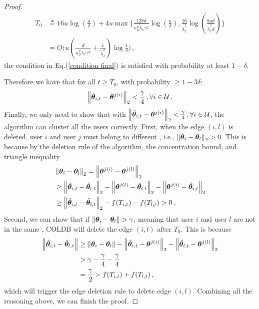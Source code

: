\begin{proof}
\begin{equation*}
    \begin{aligned}
        T_0&\triangleq 16u\log(\frac{u}{\delta})+4u\max\{
        \frac{128d}{\kappa_\mu^2\tilde{\lambda}_x\gamma^2}\log(\frac{u}{\delta}),\frac{16}{\tilde{\lambda}_x^2}\log(\frac{8ud}{\tilde{\lambda}_x^2\delta})\}\\
        &=O\bigg(u\left( \frac{d}{\kappa_\mu^2\tilde{\lambda}_x\gamma^2}+\frac{1}{\tilde{\lambda}_x^2}\right)\log \frac{1}{\delta}\bigg)\,,
    \end{aligned}
\end{equation*}
the condition in Eq.(\ref{condition final}) is satisfied with probability at least $1-\delta$.

Therefore we have that for all $t\geq T_0$, with probability $\geq 1-3\delta$:
\begin{equation}
    \left\| \hat{\boldsymbol{\theta}}_{i,t}-\boldsymbol{\theta}^{j(i)} \right\|_2<\frac{\gamma}{4}\,,\forall{i\in\mathcal{U}}\,.
    \label{final condition}
\end{equation}
Finally, we only need to show that with $\left\| \hat{\boldsymbol{\theta}}_{i,t}-\boldsymbol{\theta}^{j(i)} \right\|_2<\frac{\gamma}{4}\,,\forall{i\in\mathcal{U}}$, the algorithm can cluster all the users correctly. First, when the edge $(i,l)$ is deleted, user $i$ and user $j$ must belong to different \gtclusters{}, i.e., $\left\| \boldsymbol{\theta}_i-\boldsymbol{\theta}_l \right\|_2>0$. This is because by the deletion rule of the algorithm, the concentration bound, and triangle inequality
\begin{align}
   &\left\| \boldsymbol{\theta}_i-\boldsymbol{\theta}_l \right\|_2=\left\| \boldsymbol{\theta}^{j(i)}-\boldsymbol{\theta}^{j(l)} \right\|_2\notag\\
   &\geq\left\| \hat{\boldsymbol{\theta}}_{i,t}-\hat{\boldsymbol{\theta}}_{l,t} \right\|_2-\left\| \boldsymbol{\theta}^{j(l)}-\hat{\boldsymbol{\theta}}_{l,t} \right\|_2-\left\| \boldsymbol{\theta}^{j(i)}-\hat{\boldsymbol{\theta}}_{i,t} \right\|_2\notag\\
   &\geq\left\| \hat{\boldsymbol{\theta}}_{i,t}-\hat{\boldsymbol{\theta}}_{l,t} \right\|_2-f(T_{i,t})-f(T_{l,t})>0 \,.
\end{align}
Second, we can show that if $\norm{\btheta_i-\btheta_l}>\gamma$, meaning that user $i$ and user $l$ are not in the same \gtcluster, COLDB will delete the edge $(i,l)$ after $T_0$. This is because
\begin{align}
    \left\| \hat{\boldsymbol{\theta}}_{i,t}-\hat{\boldsymbol{\theta}}_{l,t} \right\|&\geq \left\| \boldsymbol{\theta}_i-\boldsymbol{\theta}_l \right\|-\left\| \hat{\boldsymbol{\theta}}_{i,t}-\boldsymbol{\theta}^{j(i)} \right\|_2-\left\| \hat{\boldsymbol{\theta}}_{l,t}-\boldsymbol{\theta}^{j(l)} \right\|_2\notag\\
    &>\gamma-\frac{\gamma}{4}-\frac{\gamma}{4}\notag\\
    &=\frac{\gamma}{2}>f(T_{i,t})+f(T_{l,t})\,,
\end{align}
which will trigger the edge deletion rule to delete edge $(i,l)$. Combining all the reasoning above, we can finish the proof.
\end{proof}

